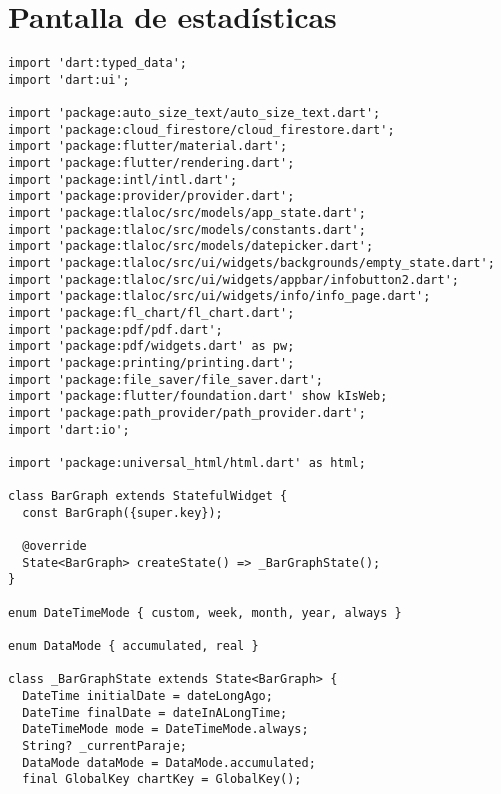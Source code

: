 \section{Pantalla de estadísticas}
\label{anexo:alg15}
\begin{verbatim}
import 'dart:typed_data';
import 'dart:ui';

import 'package:auto_size_text/auto_size_text.dart';
import 'package:cloud_firestore/cloud_firestore.dart';
import 'package:flutter/material.dart';
import 'package:flutter/rendering.dart';
import 'package:intl/intl.dart';
import 'package:provider/provider.dart';
import 'package:tlaloc/src/models/app_state.dart';
import 'package:tlaloc/src/models/constants.dart';
import 'package:tlaloc/src/models/datepicker.dart';
import 'package:tlaloc/src/ui/widgets/backgrounds/empty_state.dart';
import 'package:tlaloc/src/ui/widgets/appbar/infobutton2.dart';
import 'package:tlaloc/src/ui/widgets/info/info_page.dart';
import 'package:fl_chart/fl_chart.dart';
import 'package:pdf/pdf.dart';
import 'package:pdf/widgets.dart' as pw;
import 'package:printing/printing.dart';
import 'package:file_saver/file_saver.dart';
import 'package:flutter/foundation.dart' show kIsWeb;
import 'package:path_provider/path_provider.dart';
import 'dart:io';

import 'package:universal_html/html.dart' as html;

class BarGraph extends StatefulWidget {
  const BarGraph({super.key});

  @override
  State<BarGraph> createState() => _BarGraphState();
}

enum DateTimeMode { custom, week, month, year, always }

enum DataMode { accumulated, real }

class _BarGraphState extends State<BarGraph> {
  DateTime initialDate = dateLongAgo;
  DateTime finalDate = dateInALongTime;
  DateTimeMode mode = DateTimeMode.always;
  String? _currentParaje;
  DataMode dataMode = DataMode.accumulated;
  final GlobalKey chartKey = GlobalKey();


\end{verbatim}
